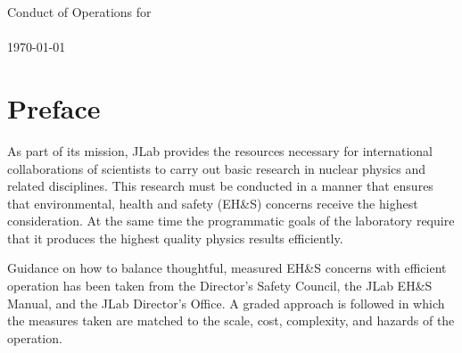 \documentclass[10pt]{article}
\begin{document}
\linenumbers
%
%
%
%
%
%
%
%
%


\begin{center}
\Large
Conduct of Operations for \HALL\ \\
\EXPTS\ \\
\today

\end{center}
\normalsize

\tableofcontents


\newpage

\section{Preface}

As part of its mission, JLab provides the resources necessary for international
collaborations of scientists to carry out basic research in nuclear physics
and related disciplines. This research must be conducted
in a manner that ensures that environmental, health and safety (EH\&S)
concerns receive the highest consideration. At the same time the programmatic
goals of the laboratory require that it produces the highest quality physics
results efficiently.

Guidance on how to balance thoughtful, measured EH\&S concerns with efficient
operation has been taken from
the Director's Safety Council, the JLab EH\&S Manual, and the
JLab Director's Office. A graded approach is followed in which the measures
taken are matched to the scale, cost, complexity, and hazards of the operation.
\end{document}
